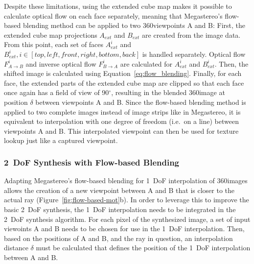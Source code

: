 Despite these limitations, using the extended cube map makes it possible to calculate optical flow on each face separately, meaning that Megastereo's flow-based blending method can be applied to two 360\degree viewpoints A and B: First, the extended cube map projections $A_{ext}$ and $B_{ext}$ are created from the image data. From this point, each set of faces $A_{ext}^{i}$ and $B_{ext}^{i}, i \in [top, left, front, right, bottom, back]$ is handled separately. Optical flow $F_{A\to B}^i$ and inverse optical flow $F_{B\to A}^i$ are calculated for $A_{ext}^{i}$ and $B_{ext}^{i}$. Then, the shifted image is calculated using Equation~\ref{eq:flow_blending}. Finally, for each face, the extended parts of the extended cube map are clipped so that each face once again has a field of view of 90$^{\circ}$, resulting in the blended 360\degree image at position $\delta$ between viewpoints A and B. Since the flow-based blending method is applied to two complete images instead of image strips like in Megastereo, it is equivalent to interpolation with one degree of freedom (i.e.\ on a line) between viewpoints A and B. This interpolated viewpoint can then be used for texture lookup just like a captured viewpoint.

\subsubsection{2~DoF Synthesis with Flow-based Blending} \label{subsec:2dof_flow-based}
Adapting Megastereo's flow-based blending for 1~DoF interpolation of 360\degree images allows the creation of a new viewpoint between A and B that is closer to the actual ray (Figure~\ref{fig:flow-based-mot}b). In order to leverage this to improve the basic 2~DoF synthesis, the 1~DoF interpolation needs to be integrated in the 2~DoF synthesis algorithm. For each pixel of the synthesized image, a set of input viewoints A and B needs to be chosen for use in the 1~DoF interpolation. Then, based on the positions of A and B, and the ray in question, an interpolation distance $\delta$ must be calculated that defines the position of the 1~DoF interpolation between A and B.

